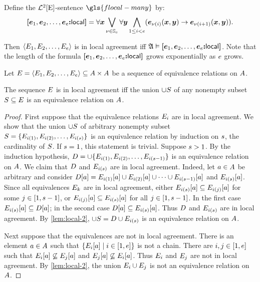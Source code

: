 \begin{definition}
Define the $\mathcal{L}^{2}[\mathrm{E}]$-sentence $\gls{flocal-many}$ by:
\[
  {\bm{[}\bm{e}_{1},\bm{e}_{2},\dots,\bm{e}_{e}\mathord{\bm{:}}\mathsf{local}\bm{]}} = \forall\bm{x}
  \bigvee_{\nu \in \mathbb{S}_{e}}
  \forall\bm{y} \bigwedge_{1 \leq i < e}
  (\bm{e}_{\nu(i)}(\bm{x},\bm{y}) \rightarrow \bm{e}_{\nu(i+1)}(\bm{x},\bm{y})).
\]
\end{definition}
Then $\left\langle E_{1},E_{2},\dots,E_{e} \right\rangle$ is in local agreement iff
$\mathfrak{A} \vDash {\bm{[}\bm{e}_{1},\bm{e}_{2},\dots,\bm{e}_{e}\mathord{\bm{:}}\mathsf{local}\bm{]}}$.
Note that the length of the formula ${\bm{[}\bm{e}_{1},\bm{e}_{2},\dots,\bm{e}_{e}\mathord{\bm{:}}\mathsf{local}\bm{]}}$ grows
exponentially as $e$ grows.

Let $E = \left\langle E_{1},E_{2},\dots,E_{e} \right\rangle \subseteq {A\times A}$
be a sequence of equivalence relations on $A$.
\begin{theorem}\label{thm:local}
The sequence $E$ is in local agreement iff
the union $\cup S$ of any nonempty subset $S \subseteq E$
is an equivalence relation on $A$.
\end{theorem}
\begin{proof}
First suppose that the equivalence relations $E_{i}$ are in local agreement.
We show that the union $\cup S$ of arbitrary nonempty subset 
$S = \{E_{i(1)}, E_{i(2)}, \dots, E_{i(s)}\}$ is
an equivalence relation by induction on $s$, the cardinality of $S$. If
$s = 1$, this statement is trivial.
Suppose $s > 1$.
By the induction hypothesis, $D = \cup \{E_{i(1)},
E_{i(2)}, \dots, E_{i(s-1)}\}$ is an equivalence relation on
$A$.
We claim that $D$ and $E_{i(s)}$ are in local agreement.
Indeed, let $a \in A$ be arbitrary and consider
$D[a] = E_{i(1)}[a] \cup E_{i(2)}[a] \cup \dots \cup
E_{i(s - 1)}[a]$ and $E_{i(s)}[a]$.
Since all equivalences $E_{k}$
are in local agreement, either
$E_{i(s)}[a] \subseteq E_{i(j)}[a]$ 
for some $j \in [1, s-1]$,
or $E_{i(j)}[a] \subseteq E_{i(s)}[a]$
for all $j \in [1, s-1]$.
In the first case $E_{i(s)}[a] \subseteq D[a]$;
in the second case $D[a] \subseteq E_{i(s)}[a]$.
Thus $D$ and $E_{i(s)}$ are in local agreement.
By \cref{lem:local-2}, $\cup S = D \cup E_{i(s)}$ is an
equivalence relation on $A$.

Next suppose that the equivalences are not in local agreement.
There is an element $a \in A$ such that
$\left\{E_{i}[a]\mathrel{}\middle|\mathrel{}i \in [1, e]\right\}$ is not a chain. 
There are $i, j \in [1, e]$ such that
$E_{i}[a] \not\subseteq E_{j}[a]$ and
$E_{j}[a] \not\subseteq E_{i}[a]$.
Thus $E_{i}$ and $E_{j}$ are not in local agreement.
By \cref{lem:local-2}, the union $E_{i} \cup E_{j}$ is not an
equivalence relation on $A$.
\end{proof}

